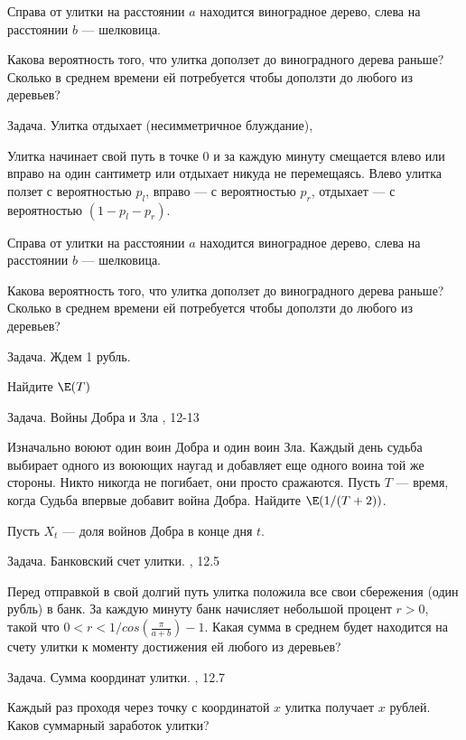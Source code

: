 Справа от улитки на расстоянии $a$ находится виноградное дерево, слева на расстоянии $b$ --- шелковица.

Какова вероятность того, что улитка доползет до виноградного дерева раньше? Сколько в среднем времени ей потребуется чтобы доползти до любого из деревьев?



Задача. Улитка отдыхает (несимметричное блуждание), \cite{blom:pspt}

Улитка начинает свой путь в точке 0 и за каждую минуту смещается влево или вправо на один сантиметр или отдыхает никуда не перемещаясь. Влево улитка ползет с вероятностью $p_{l}$, вправо --- с вероятностью $p_{r}$, отдыхает --- с вероятностью $(1-p_{l}-p_{r})$. 

Справа от улитки на расстоянии $a$ находится виноградное дерево, слева на расстоянии $b$ --- шелковица.

Какова вероятность того, что улитка доползет до виноградного дерева раньше? Сколько в среднем времени ей потребуется чтобы доползти до любого из деревьев?

Задача. Ждем 1 рубль. 

Найдите $\E(T)$


Задача. Войны Добра и Зла \cite{stirzaker:otep}, 12-13

Изначально воюют один воин Добра и один воин Зла. Каждый день судьба выбирает одного из воюющих наугад и добавляет еще одного воина той же стороны. Никто никогда не погибает, они просто сражаются. Пусть $T$ --- время, когда Судьба впервые добавит война Добра.  Найдите $\E(1/(T+2)) $.

Пусть $ X_{t} $ --- доля войнов Добра в конце дня $ t $.



Задача. Банковский счет улитки. \cite{stirzaker:prp}, 12.5

Перед отправкой в свой долгий путь улитка положила все свои сбережения (один рубль) в банк. За каждую минуту банк начисляет небольшой процент $r>0$, такой что $0<r<1/cos(\frac{\pi}{a+b})-1$. Какая сумма в среднем будет находится на счету улитки к моменту достижения ей любого из деревьев?

Задача. Сумма координат улитки. \cite{stirzaker:prp}, 12.7

Каждый раз проходя через точку с координатой $x$ улитка получает $x$ рублей. Каков суммарный заработок улитки?


